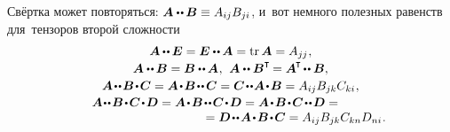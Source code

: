 \begin{otherlanguage}{russian}
Свёртка может повторяться: ${\bm{A} \dotdotp \hspace{-0.1ex} \bm{B} \equiv A_{ij} B_{ji}}$, и~вот немного полезных равенств для~тензоров второй сложности
\begin{equation}
\begin{array}{c}
\bm{A} \hspace{-0.1ex} \dotdotp \hspace{-0.1ex} \bm{E} = \bm{E} \dotdotp \hspace{-0.1ex} \bm{A} = \operatorname{tr} \bm{A} = A_{jj} \hspace{0.1ex} ,
\\[.2em]
%
\bm{A} \dotdotp \hspace{-0.1ex} \bm{B} = \bm{B} \dotdotp \hspace{-0.1ex} \bm{A} \hspace{0.1ex}, \:\,
\bm{A} \dotdotp \bm{B}^{\T} \hspace{-0.2ex} = \bm{A}^{\hspace{-0.16ex}\T} \hspace{-0.2ex} \dotdotp \bm{B} ,
\\[.2em]
%
\bm{A} \narrowdotdotp \bm{B} \narrowdotp \bm{C} = \bm{A} \narrowdotp \bm{B} \narrowdotdotp \hspace{0.1ex} \bm{C} = \bm{C} \narrowdotdotp \hspace{-0.1ex} \bm{A} \narrowdotp \bm{B} = A_{ij} B_{jk} C_{ki} \hspace{0.1ex} ,
\\[.15em]
%
\bm{A} \hspace{-0.1ex}\narrowdotdotp \bm{B} \narrowdotp \bm{C} \narrowdotp \bm{D} = \bm{A} \narrowdotp \bm{B} \narrowdotdotp \bm{C} \narrowdotp \bm{D} = \bm{A} \narrowdotp \bm{B} \narrowdotp \bm{C} \narrowdotdotp \bm{D} = \hspace*{2.5em} \\
\hspace{10.5em} = \bm{D} \narrowdotdotp \bm{A} \narrowdotp \bm{B} \narrowdotp \bm{C} = A_{ij} B_{jk} C_{kn} D_{ni} \hspace{0.1ex}.
\end{array}
\end{equation}

\end{otherlanguage}


